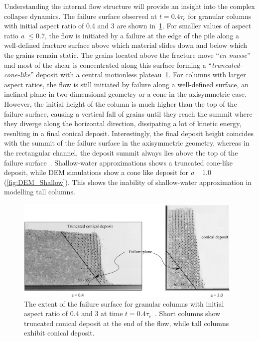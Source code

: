 Understanding the internal flow structure will provide an insight into the 
complex collapse dynamics.  The failure surface observed at $t 
= 0.4 \tau_c$ for granular columns with initial aspect ratio of 0.4 and 3 are 
shown in~\cref{fig:Deposit}.  For smaller values of aspect ratio \textit{a} 
$\le 0.7$, the flow is initiated by a failure at the edge of the pile along a 
well-defined fracture surface above which material slides down and below which 
the grains remain static. The grains located above the fracture move 
``\textit{en masse}'' and most of the shear is concentrated along this surface 
forming a ``\textit{truncated-cone-like}'' deposit with a central motionless 
plateau~\cref{fig:Deposit}. For columns with larger aspect ratios, the flow is 
still initiated by 
failure along a well-defined surface, an inclined plane in two-dimensional 
geometry or a cone in the axisymmetric case. However, the initial height of 
the column is much higher than the top of the failure surface, causing a 
vertical fall of grains until they reach the summit where they diverge along 
the horizontal direction, dissipating a lot of kinetic energy, resulting in a 
final conical deposit. Interestingly, the final deposit 
height coincides with the summit of the failure surface in the axisymmetric 
geometry, whereas in the rectangular channel, the deposit summit always lies 
above the top of the failure surface~\citep{Lajeunesse2005}. Shallow-water 
approximations shows a truncated cone-like deposit, while DEM simulations show 
a cone like deposit for \textit{a} ~ 1.0 (\cref{fig:DEM_Shallow}). This shows 
the inability of shallow-water approximation in modelling tall columns.

\begin{figure}[tbhp]
\centering
\includegraphics[width=0.975\textwidth]{Deposit}
\caption{The extent of the failure surface for granular columns with initial 
aspect ratio of 0.4 and 3 at time $t= 0.4\tau_c$~\citep{Lajeunesse2004}. Short 
columns show truncated conical deposit at the end of the flow, while tall 
columns exhibit conical deposit.}
\label{fig:Deposit}
\end{figure}


